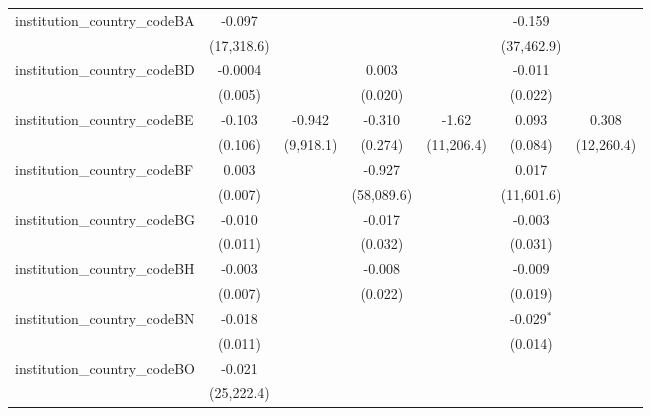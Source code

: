 \begin{tabular}{lcccccc}
   institution\_country\_codeBA          & -0.097         &               &               &              & -0.159       &   \\   
                                         & (17,318.6)     &               &               &              & (37,462.9)   &   \\   
   institution\_country\_codeBD          & -0.0004        &               & 0.003         &              & -0.011       &   \\   
                                         & (0.005)        &               & (0.020)       &              & (0.022)      &   \\   
   institution\_country\_codeBE          & -0.103         & -0.942        & -0.310        & -1.62        & 0.093        & 0.308\\   
                                         & (0.106)        & (9,918.1)     & (0.274)       & (11,206.4)   & (0.084)      & (12,260.4)\\   
   institution\_country\_codeBF          & 0.003          &               & -0.927        &              & 0.017        &   \\   
                                         & (0.007)        &               & (58,089.6)    &              & (11,601.6)   &   \\   
   institution\_country\_codeBG          & -0.010         &               & -0.017        &              & -0.003       &   \\   
                                         & (0.011)        &               & (0.032)       &              & (0.031)      &   \\   
   institution\_country\_codeBH          & -0.003         &               & -0.008        &              & -0.009       &   \\   
                                         & (0.007)        &               & (0.022)       &              & (0.019)      &   \\   
   institution\_country\_codeBN          & -0.018         &               &               &              & -0.029$^{*}$ &   \\   
                                         & (0.011)        &               &               &              & (0.014)      &   \\   
   institution\_country\_codeBO          & -0.021         &               &               &              &              &   \\   
                                         & (25,222.4)     &               &               &              &              &   \\   

\end{tabular}
